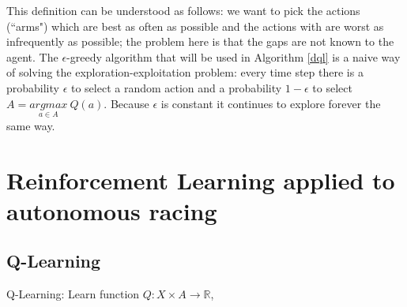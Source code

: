 This definition can be understood as follows: we want to pick the actions (``arms") which are best as often as possible and the actions with are worst as infrequently as possible; the problem here is that the gaps are not known to the agent. \newline
The $\epsilon$-greedy algorithm that will be used in Algorithm \ref{dql} is a naive way of solving the exploration-exploitation problem: every time step there is a probability $\epsilon$ to select a random action and a probability $1-\epsilon$ to select $A = \underset{a \in A}{argmax} \: Q(a)$. Because $\epsilon$ is constant it continues to explore forever the same way.


\section{Reinforcement Learning applied to autonomous racing}
\label{rlaracing}
\subsection{Q-Learning}
\label{qlearningsection}
\begin{algorithm}
\caption{Q-Learning: Learn function $Q: X \times A \rightarrow \mathbb{R}$, \cite{watkins1989}}
\label{qlearning}
\end{algorithm}


